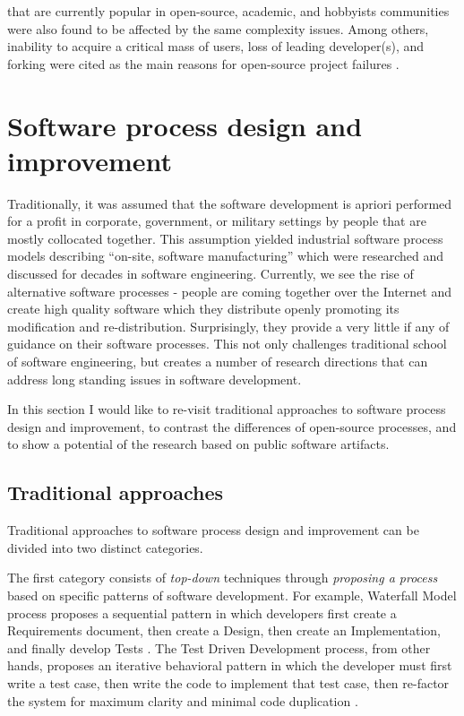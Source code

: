 that are 
currently popular in open-source, academic, and hobbyists communities were also found to be affected 
by the same complexity issues. Among others, inability to acquire a critical mass of users, loss of leading 
developer(s), and forking were cited as the main reasons for open-source project 
failures \cite{richter2007critique}. 

%
%
\section{Software process design and improvement}\label{section_software_process_design}
Traditionally, it was assumed that the software development is apriori performed for a profit in 
corporate, government, or military settings by people that are mostly collocated together. 
This assumption yielded industrial software process models describing ``on-site, software manufacturing'' 
which were researched and discussed for decades in software  engineering. 
Currently, we see the rise of alternative software processes - people are coming 
together over the Internet and create high quality software which they distribute openly 
promoting its modification and re-distribution. Surprisingly, they provide a very little if any of
guidance on their software processes. This not only challenges traditional school of software 
engineering, but creates a number of research directions that can address long standing issues 
in software development.

In this section I would like to re-visit traditional approaches to software process design and improvement, 
to contrast the differences of open-source processes, and to show a potential of the research based 
on public software artifacts.

\subsection{Traditional approaches}
Traditional approaches to software process design and improvement can be divided into two distinct categories. 

The first category consists of \textit{top-down} techniques through \textit{proposing a process} based 
on specific patterns of software development. 
For example, Waterfall Model process proposes a sequential pattern in which developers first create a 
Requirements document, then create a Design, then create an Implementation, and finally develop Tests 
\cite{citeulike:9982731}. 
The Test Driven Development process, from other hands, proposes an iterative behavioral pattern in which
the developer must first write a test case, then write the code to implement that test case, then re-factor the 
system for maximum clarity and minimal code duplication \cite{citeulike:6086365}. 

